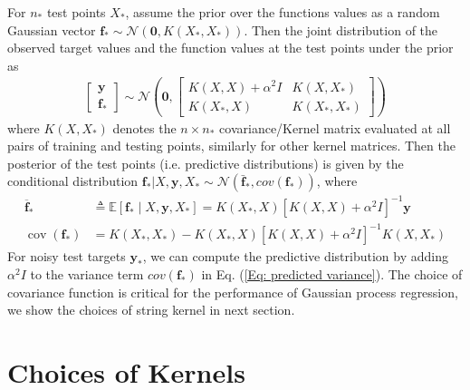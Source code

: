 For $n_\ast$ test points $X_\ast$, assume the prior over the functions values as a random Gaussian vector $\mathbf{f}_\ast \sim \mathcal{N}(\mathbf{0}, K(X_\ast, X_\ast))$.
Then the joint distribution of the observed target values and the function values at the test points under the prior as 
\begin{align}
    \left[\begin{array}{l}\mathbf{y} \\ \mathbf{f}_{*}\end{array}\right] \sim \mathcal{N}\left(\mathbf{0},\left[\begin{array}{cc}K(X, X)+\alpha^{2} I & K\left(X, X_{*}\right) \\ K\left(X_{*}, X\right) & K\left(X_{*}, X_{*}\right)\end{array}\right]\right)
\end{align}
where $K(X, X_\ast)$ denotes the $n \times n_\ast$ covariance/Kernel matrix evaluated at all pairs of training and testing points, similarly for other kernel matrices.
Then the posterior of the test points (i.e. predictive distributions) is given by the conditional distribution $\mathbf{f}_\ast | X, \mathbf{y}, X_\ast \sim \mathcal{N}(\bar{\mathbf{f}}_\ast, cov(\mathbf{f}_\ast))$, where
\begin{align}
   \overline{\mathbf{f}}_{*} & \triangleq \mathbb{E}\left[\mathbf{f}_{*} \mid X, \mathbf{y}, X_{*}\right]=K\left(X_{*}, X\right)\left[K(X, X)+\alpha^{2} I\right]^{-1} \mathbf{y} \\
   \label{Eq: predicted variance}
   \operatorname{cov}\left(\mathbf{f}_{*}\right) &=K\left(X_{*}, X_{*}\right)-K\left(X_{*}, X\right)\left[K(X, X)+\alpha^{2} I\right]^{-1} K\left(X, X_{*}\right) 
\end{align}
For noisy test targets $\mathbf{y}_\ast$, we can compute the predictive distribution by adding $\alpha^2 I$ to the variance term $cov(\mathbf{f}_\ast)$ in Eq. (\ref{Eq: predicted variance}).
The choice of covariance function is critical for the performance of Gaussian process regression, we show the choices of string kernel in next section.


\section{Choices of Kernels}

